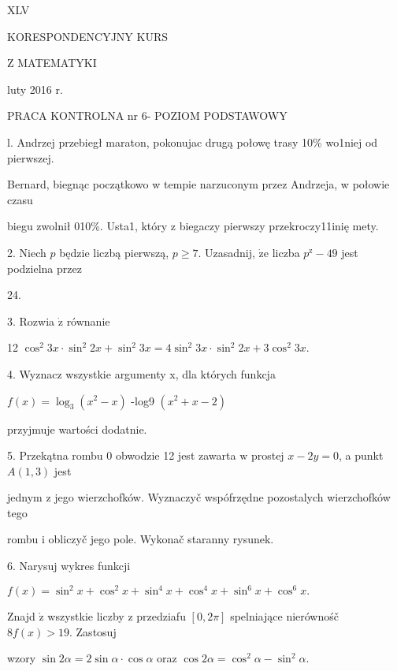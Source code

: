 \documentclass[a4paper,12pt]{article}
\begin{document}
XLV

KORESPONDENCYJNY KURS

Z MATEMATYKI

luty 2016 r.

PRACA KONTROLNA nr 6- POZIOM PODSTAWOWY

l. Andrzej przebiegł maraton, pokonujac drugą połowę trasy 10\% wo1niej od pierwszej.

Bernard, biegnąc początkowo w tempie narzuconym przez Andrzeja, w połowie czasu

biegu zwolnił 010\%. Usta1, który z biegaczy pierwszy przekroczy11inię mety.

2. Niech $p$ będzie liczbą pierwszą, $p\geq 7$. Uzasadnij, $\dot{\mathrm{z}}\mathrm{e}$ liczba $p^{\mathrm{z}}-49$ jest podzielna przez

24.

3. Rozwia $\dot{\mathrm{z}}$ równanie

12 $\cos^{2}3x\cdot\sin^{2}2x+\sin^{2}3x=4\sin^{2}3x\cdot\sin^{2}2x+3\cos^{2}3x.$

4. Wyznacz wszystkie argumenty x, dla których funkcja

$f(x)=\log_{3}(x^{2}-x)$ -log9 $(x^{2}+x-2)$

przyjmuje wartości dodatnie.

5. Przekątna rombu $0$ obwodzie 12 jest zawarta $\mathrm{w}$ prostej $x-2y=0$, a punkt $A(1,3)$ jest

jednym $\mathrm{z}$ jego wierzchofków. Wyznaczyč wspófrzędne pozostalych wierzchofków tego

rombu $\mathrm{i}$ obliczyč jego pole. Wykonač staranny rysunek.

6. Narysuj wykres funkcji

$f(x)=\sin^{2}x+\cos^{2}x+\sin^{4}x+\cos^{4}x+\sin^{6}x+\cos^{6}x.$

Znajd $\acute{\mathrm{z}}$ wszystkie liczby $\mathrm{z}$ przedziafu $[0,2\pi]$ spelniające nierównośč $8f(x)>19$. Zastosuj

wzory $\sin 2\alpha=2\sin\alpha\cdot\cos\alpha$ oraz $\cos 2\alpha=\cos^{2}\alpha-\sin^{2}\alpha.$
\end{document}
